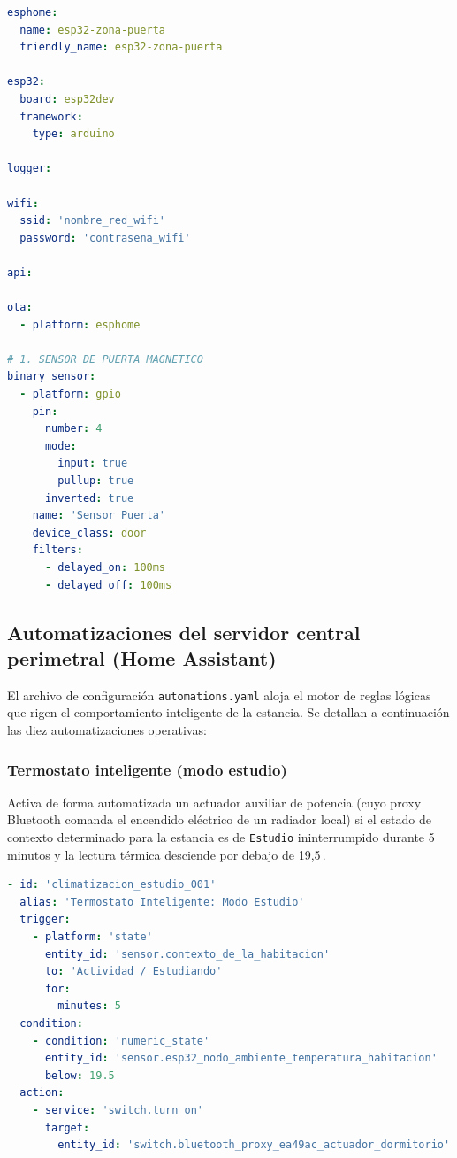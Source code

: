\begin{lstlisting}[language=YAML, caption={Firmware completo del Nodo de Puerta.}, label={lst:code_nodo_puerta}]
esphome:
  name: esp32-zona-puerta
  friendly_name: esp32-zona-puerta

esp32:
  board: esp32dev
  framework:
    type: arduino

logger:

wifi:
  ssid: 'nombre_red_wifi'
  password: 'contrasena_wifi'

api:

ota:
  - platform: esphome

# 1. SENSOR DE PUERTA MAGNETICO
binary_sensor:
  - platform: gpio
    pin:
      number: 4
      mode:
        input: true
        pullup: true
      inverted: true
    name: 'Sensor Puerta'
    device_class: door
    filters:
      - delayed_on: 100ms
      - delayed_off: 100ms
\end{lstlisting}

\subsection{Automatizaciones del servidor central perimetral (Home Assistant)}
El archivo de configuración \texttt{automations.yaml} aloja el motor de reglas lógicas que rigen el comportamiento inteligente de la estancia. Se detallan a continuación las diez automatizaciones operativas:

\subsubsection{Termostato inteligente (modo estudio)}
Activa de forma automatizada un actuador auxiliar de potencia (cuyo proxy Bluetooth comanda el encendido eléctrico de un radiador local) si el estado de contexto determinado para la estancia es de \texttt{Estudio} ininterrumpido durante 5 minutos y la lectura térmica desciende por debajo de 19,5\,.

\begin{lstlisting}[language=YAML, caption={Código de control térmico reactivo al contexto de estudio.}, label={lst:auto_climatizacion}]
- id: 'climatizacion_estudio_001'
  alias: 'Termostato Inteligente: Modo Estudio'
  trigger:
    - platform: 'state'
      entity_id: 'sensor.contexto_de_la_habitacion'
      to: 'Actividad / Estudiando'
      for:
        minutes: 5
  condition:
    - condition: 'numeric_state'
      entity_id: 'sensor.esp32_nodo_ambiente_temperatura_habitacion'
      below: 19.5
  action:
    - service: 'switch.turn_on'
      target:
        entity_id: 'switch.bluetooth_proxy_ea49ac_actuador_dormitorio'
\end{lstlisting}

